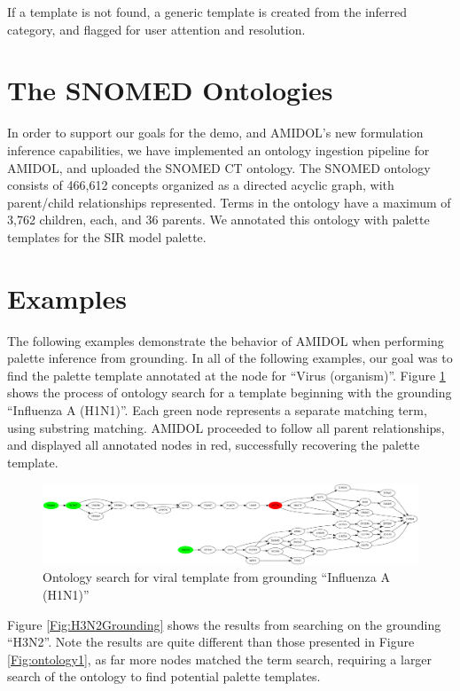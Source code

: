 \documentclass[11pt]{article}
\theoremstyle{definition}
\newcommand{\amidol}{\textsc{AMIDOL}}
\begin{document}
If a template is not found, a generic template is created from the
inferred category, and flagged
for user attention and resolution.

\section{The SNOMED Ontologies}

In order to support our goals for the demo, and \amidol{}'s new
formulation inference capabilities, we have implemented an ontology
ingestion pipeline for \amidol{}, and uploaded the SNOMED CT
ontology.  The SNOMED ontology consists of 466,612 concepts organized
as a directed acyclic graph, with parent/child relationships
represented.  Terms in the ontology have a maximum of 3,762 children,
each, and 36 parents.  We annotated this ontology with palette
templates for the SIR model palette.

\section{Examples}

The following examples demonstrate the behavior of \amidol{} when
performing palette inference from grounding.  In all of the following
examples, our goal was to find the palette template annotated at the
node for ``Virus (organism)''.  Figure
\ref{Fig:H1N1Grounding} shows the process of ontology search for a
template beginning with the grounding ``Influenza A (H1N1)''.  Each
green node represents a separate matching term, using substring
matching.  \amidol{} proceeded to follow all parent relationships, and
displayed all annotated nodes in red, successfully recovering the
palette template.

\begin{figure}
  \begin{center}
    \includegraphics[width=\textwidth]{H1N1.png}
  \end{center}
  \caption{Ontology search for viral template from grounding
    ``Influenza A (H1N1)''}
  \label{Fig:H1N1Grounding}
\end{figure}

Figure \ref{Fig:H3N2Grounding} shows the results from searching on the
grounding ``H3N2''.  Note the results are quite different than those
presented in Figure \ref{Fig:ontology1}, as far more nodes matched the
term search, requiring a larger search of the ontology to find
potential palette templates.
\end{document}
